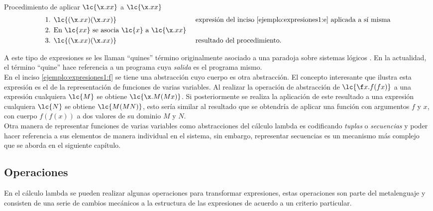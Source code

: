 \begin{ejemplo} Procedimiento de aplicar \(\lc{\x.x x}\) a \(\lc{\x.x x}\)
  \label{ejemplo:aplicacion2}
  \begin{align*}
    \text{1. } &\lc{(\x.x x)(\x.x x)} & &\text{ expresión del inciso \ref{ejemplo:expresiones1:e} aplicada a sí misma}\\
    \text{2. } &\text{En } \lc{x x} \text{ se asocia } \lc{x} \text{ a } \lc{\x.x x} \\
    \text{3. } &\lc{(\x.x x)(\x.x x)} & &\text{ resultado del procedimiento.}
  \end{align*}
\end{ejemplo}

A este tipo de expresiones se les llaman ``quines''
\cite[pp.~431--437]{Hofstadter:GEB} término originalmente asociado a una
paradoja sobre sistemas lógicos \cite{Quine:Paradox}. En la actualidad, el
término ``quine'' hace referencia a un programa cuya \emph{salida} es el
programa mismo. \\

En el inciso \ref{ejemplo:expresiones1:f} se tiene una abstracción cuyo cuerpo
es otra abstracción. El concepto interesante que ilustra esta expresión es el de
la representación de funciones de varias variables. Al realizar la operación de
abstracción de \(\lc{\f x.f(f x)}\) a una expresión cualquiera \(\lc{M}\) se
obtiene \(\lc{\x.M(M x)}\). Si posteriormente se realiza la aplicación de este
resultado a una expresión cualquiera \(\lc{N}\) se obtiene \(\lc{M(M N)}\), esto
sería similar al resultado que se obtendría de aplicar una función con
argumentos \(f\) y \(x\), con cuerpo \(f(f(x))\) a dos valores de su dominio
\(M\) y \(N\).
\\

Otra manera de representar funciones de varias variables como abstracciones del
cálculo lambda es codificando \emph{tuplas} o \emph{secuencias} y poder hacer
referencia a sus elementos de manera individual en el sistema, sin embargo,
representar secuencias es un mecanismo más complejo que se aborda en el
siguiente capítulo. \\

\subsection{Operaciones}

En el cálculo lambda se pueden realizar algunas operaciones para transformar
expresiones, estas operaciones son parte del metalenguaje y consisten de una
serie de cambios mecánicos a la estructura de las expresiones de acuerdo a un
criterio particular. \\

